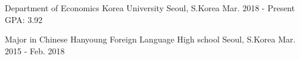 

\begin{cventries}

  \cventry
    {Department of Economics} %
    {Korea University} %
    {Seoul, S.Korea} %
    {Mar. 2018 - Present} %
    {GPA: 3.92}

  \cventry
    {Major in Chinese} %
    {Hanyoung Foreign Language High school} %
    {Seoul, S.Korea} %
    {Mar. 2015 - Feb. 2018} %
    {}
\vspace{-5mm}
\end{cventries}


